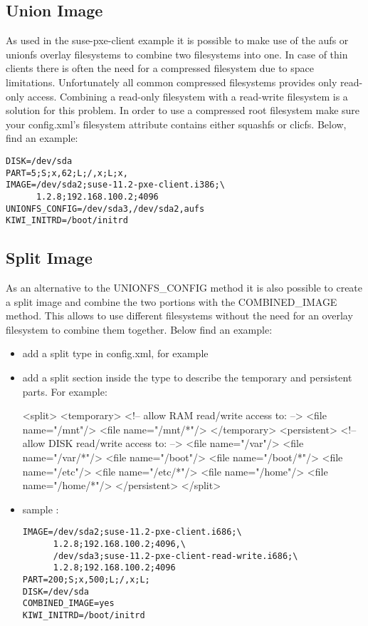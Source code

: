 \subsection{Union Image}

As used in the suse-pxe-client example it is possible to make use of the
aufs or unionfs overlay filesystems to combine two filesystems
into one. In case of thin clients there is often the need for
a compressed filesystem due to space limitations. Unfortunately
all common compressed filesystems provides only read-only access.
Combining a read-only filesystem with a read-write filesystem
is a solution for this problem. In order to use a compressed
root filesystem make sure your config.xml's filesystem attribute
contains either squashfs or clicfs. Below, find an example:

\begin{verbatim}
DISK=/dev/sda
PART=5;S;x,62;L;/,x;L;x,
IMAGE=/dev/sda2;suse-11.2-pxe-client.i386;\
      1.2.8;192.168.100.2;4096
UNIONFS_CONFIG=/dev/sda3,/dev/sda2,aufs
KIWI_INITRD=/boot/initrd
\end{verbatim}

\subsection{Split Image}

As an alternative to the UNIONFS\_CONFIG method it is also
possible to create a split image and combine the two portions
with the COMBINED\_IMAGE method. This allows to use different
filesystems without the need for an overlay filesystem to combine
them together. Below find an example:

\begin{itemize}
\item add a split type in config.xml, for example %
\item add a split section inside the type to describe the temporary
      and persistent parts. For example:
\begin{xml}
<split>
   <temporary>
      <!-- allow RAM read/write access to: -->
      <file name="/mnt"/>
      <file name="/mnt/*"/>
   </temporary>
   <persistent>
      <!-- allow DISK read/write access to: -->
      <file name="/var"/>
      <file name="/var/*"/>
      <file name="/boot"/>
      <file name="/boot/*"/>
      <file name="/etc"/>
      <file name="/etc/*"/>
      <file name="/home"/>
      <file name="/home/*"/>
   </persistent>
</split>
\end{xml}
\item sample :
     
\begin{verbatim}
IMAGE=/dev/sda2;suse-11.2-pxe-client.i686;\
      1.2.8;192.168.100.2;4096,\
      /dev/sda3;suse-11.2-pxe-client-read-write.i686;\
      1.2.8;192.168.100.2;4096
PART=200;S;x,500;L;/,x;L;
DISK=/dev/sda
COMBINED_IMAGE=yes
KIWI_INITRD=/boot/initrd
\end{verbatim}
\end{itemize}

